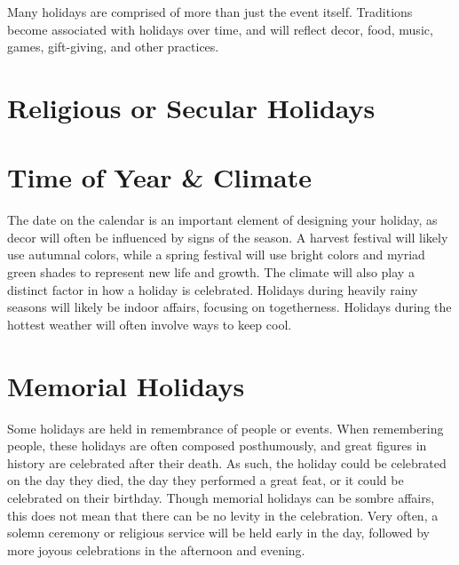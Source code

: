 \documentclass[10pt,a4paper,twoside,bg=print,twocolumn,openany,nodeprecatedcode]{dndbook}
\begin{document}
Many holidays are comprised of more than just the event itself. Traditions become associated with holidays over time, and will reflect decor, food, music, games, gift-giving, and other practices.
\section{Religious or Secular Holidays}

\section{Time of Year \& Climate}
The date on the calendar is an important element of designing your holiday, as decor will often be influenced by signs of the season. A harvest festival will likely use autumnal colors, while a spring festival will use bright colors and myriad green shades to represent new life and growth.
The climate will also play a distinct factor in how a holiday is celebrated. Holidays during heavily rainy seasons will likely be indoor affairs, focusing on togetherness. Holidays during the hottest weather will often involve ways to keep cool.
\section{Memorial Holidays}
Some holidays are held in remembrance of people or events. When remembering people, these holidays are often composed posthumously, and great figures in history are celebrated after their death. As such, the holiday could be celebrated on the day they died, the day they performed a great feat, or it could be celebrated on their birthday.
Though memorial holidays can be sombre affairs, this does not mean that there can be no levity in the celebration. Very often, a solemn ceremony or religious service will be held early in the day, followed by more joyous celebrations in the afternoon and evening.
\end{document}
